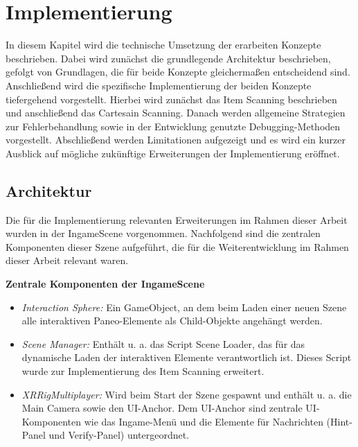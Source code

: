 \chapter{Implementierung}
\label{chap:Implementierung}


In diesem Kapitel wird die technische Umsetzung der erarbeiten Konzepte beschrieben. Dabei wird zunächst die grundlegende Architektur beschrieben, gefolgt von Grundlagen, die für beide Konzepte gleichermaßen entscheidend sind. Anschließend wird die spezifische Implementierung der beiden Konzepte tiefergehend vorgestellt. Hierbei wird zunächst das Item Scanning beschrieben und anschließend das Cartesain Scanning. Danach werden allgemeine Strategien zur Fehlerbehandlung sowie in der Entwicklung genutzte Debugging-Methoden vorgestellt. Abschließend werden Limitationen aufgezeigt und es wird ein kurzer Ausblick auf mögliche zukünftige Erweiterungen der Implementierung eröffnet. 

\section{Architektur}
Die für die Implementierung relevanten Erweiterungen im Rahmen dieser Arbeit wurden in der IngameScene vorgenommen. Nachfolgend sind die zentralen Komponenten dieser Szene aufgeführt, die für die Weiterentwicklung im Rahmen dieser Arbeit relevant waren. 

{\normalfont \bfseries Zentrale Komponenten der IngameScene}

\begin{itemize}
    \item \textit{Interaction Sphere:} Ein GameObject, an dem beim Laden einer neuen Szene alle interaktiven Paneo-Elemente als Child-Objekte angehängt werden.
    \item \textit{Scene Manager:} Enthält u. a. das Script Scene Loader, das für das dynamische Laden der interaktiven Elemente verantwortlich ist. Dieses Script wurde zur Implementierung des Item Scanning erweitert. 
    \item \textit{XRRigMultiplayer:} Wird beim Start der Szene gespawnt und enthält u. a. die Main Camera sowie den UI-Anchor. Dem UI-Anchor sind zentrale UI-Komponenten wie das Ingame-Menü und die Elemente für Nachrichten (Hint-Panel und Verify-Panel) untergeordnet.    
\end{itemize}

